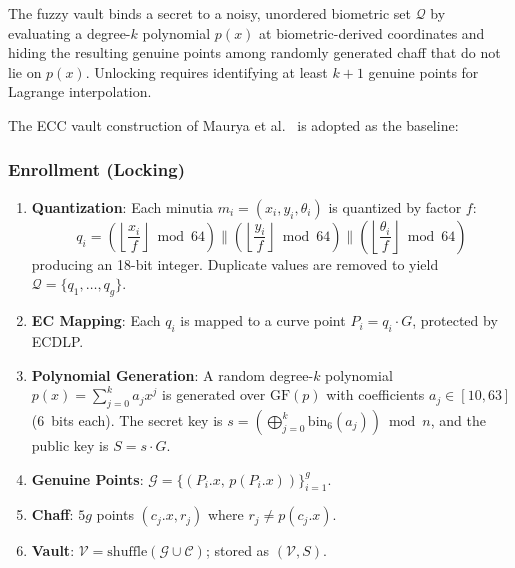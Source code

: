 The fuzzy vault \cite{juels2002fuzzy} binds a secret to a noisy, unordered
biometric set $\mathcal{Q}$ by evaluating a degree-$k$ polynomial $p(x)$ at
biometric-derived coordinates and hiding the resulting genuine points among
randomly generated chaff that do not lie on $p(x)$. Unlocking requires
identifying at least $k{+}1$ genuine points for Lagrange interpolation.

The ECC vault construction of Maurya et al.\ \cite{maurya2025enhancing} is
adopted as the baseline:

\subsubsection{Enrollment (Locking)}
\begin{enumerate}
  \item \textbf{Quantization}: Each minutia $m_i = (x_i, y_i, \theta_i)$ is
  quantized by factor $f$:
  \begin{equation}
    q_i = \left(\left\lfloor\frac{x_i}{f}\right\rfloor \bmod 64\right) \|
          \left(\left\lfloor\frac{y_i}{f}\right\rfloor \bmod 64\right) \|
          \left(\left\lfloor\frac{\theta_i}{f}\right\rfloor \bmod 64\right)
  \end{equation}
  producing an 18-bit integer. Duplicate values are removed to yield
  $\mathcal{Q} = \{q_1, \ldots, q_g\}$.

  \item \textbf{EC Mapping}: Each $q_i$ is mapped to a curve point
  $P_i = q_i \cdot G$, protected by ECDLP.

  \item \textbf{Polynomial Generation}: A random degree-$k$ polynomial
  $p(x) = \sum_{j=0}^{k} a_j x^j$ is generated over $\mathrm{GF}(p)$ with
  coefficients $a_j \in [10,63]$ (6~bits each). The secret key is
  $s = \left(\bigoplus_{j=0}^{k} \mathrm{bin}_6(a_j)\right) \bmod n$,
  and the public key is $S = s \cdot G$.

  \item \textbf{Genuine Points}: $\mathcal{G} = \{(P_i.x,\, p(P_i.x))\}_{i=1}^g$.

  \item \textbf{Chaff}: $5g$ points $(c_j.x, r_j)$ where $r_j \neq p(c_j.x)$.

  \item \textbf{Vault}: $\mathcal{V} = \mathrm{shuffle}(\mathcal{G} \cup \mathcal{C})$;
  stored as $(\mathcal{V}, S)$.
\end{enumerate}

